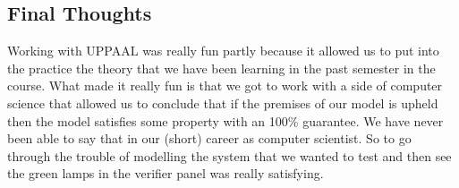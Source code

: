 \documentclass{article}
\begin{document}
\subsection*{Final Thoughts}
Working with UPPAAL was really fun partly because it allowed us to put into the practice the theory that we have been learning in the past semester in the course. What made it really fun is that we got to work with a side of computer science that allowed us to conclude that if the premises of our model is upheld then the model satisfies some property with an 100\% guarantee. We have never been able to say that in our (short) career as computer scientist. So to go through the trouble of modelling the system that we wanted to test and then see the green lamps in the verifier panel was really satisfying.
\end{document}
